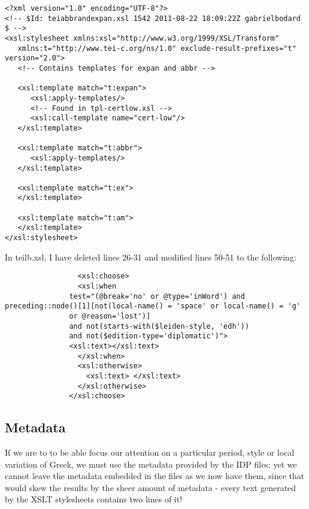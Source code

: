 \begin{lstlisting}
<?xml version="1.0" encoding="UTF-8"?>
<!-- $Id: teiabbrandexpan.xsl 1542 2011-08-22 18:09:22Z gabrielbodard $ -->
<xsl:stylesheet xmlns:xsl="http://www.w3.org/1999/XSL/Transform"
   xmlns:t="http://www.tei-c.org/ns/1.0" exclude-result-prefixes="t"  version="2.0">
   <!-- Contains templates for expan and abbr -->

   <xsl:template match="t:expan">
      <xsl:apply-templates/>
      <!-- Found in tpl-certlow.xsl -->
      <xsl:call-template name="cert-low"/>
   </xsl:template>

   <xsl:template match="t:abbr">
      <xsl:apply-templates/>
   </xsl:template>

   <xsl:template match="t:ex">
   </xsl:template>

   <xsl:template match="t:am">
   </xsl:template>
</xsl:stylesheet>
\end{lstlisting}


In teilb.xsl, I have deleted lines 26-31 and modified lines 50-51 to the
following:

\begin{lstlisting}
                 <xsl:choose>
                 <xsl:when
               test="(@break='no' or @type='inWord') and preceding::node()[1][not(local-name() = 'space' or local-name() = 'g'
               or @reason='lost')]
               and not(starts-with($leiden-style, 'edh'))
               and not($edition-type='diplomatic')">
               <xsl:text></xsl:text>
                 </xsl:when>
                 <xsl:otherwise>
                   <xsl:text> </xsl:text>
                 </xsl:otherwise>
               </xsl:choose>
\end{lstlisting}
\subsection{Metadata}
\label{subsect:metadata}

If we are to to be able focus our attention on a particular period, style or
local variation of Greek, we must use the metadata provided by the IDP files;
yet we cannot leave the metadata embedded in the files as we now have them,
since that would skew the results by the sheer amount of metadata - every text
generated by the XSLT stylesheets contains two lines of it!
